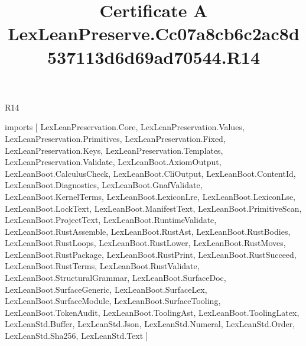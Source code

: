\begin{lexlean}{R14}
\title{Certificate A LexLeanPreserve.Cc07a8cb6c2ac8d537113d6d69ad70544.R14}
\begin{coremodule}
imports [
  LexLeanPreservation.Core,
  LexLeanPreservation.Values,
  LexLeanPreservation.Primitives,
  LexLeanPreservation.Fixed,
  LexLeanPreservation.Keys,
  LexLeanPreservation.Templates,
  LexLeanPreservation.Validate,
  LexLeanBoot.AxiomOutput,
  LexLeanBoot.CalculusCheck,
  LexLeanBoot.CliOutput,
  LexLeanBoot.ContentId,
  LexLeanBoot.Diagnostics,
  LexLeanBoot.GnafValidate,
  LexLeanBoot.KernelTerms,
  LexLeanBoot.LexiconLre,
  LexLeanBoot.LexiconLse,
  LexLeanBoot.LockText,
  LexLeanBoot.ManifestText,
  LexLeanBoot.PrimitiveScan,
  LexLeanBoot.ProjectText,
  LexLeanBoot.RuntimeValidate,
  LexLeanBoot.RustAssemble,
  LexLeanBoot.RustAst,
  LexLeanBoot.RustBodies,
  LexLeanBoot.RustLoops,
  LexLeanBoot.RustLower,
  LexLeanBoot.RustMoves,
  LexLeanBoot.RustPackage,
  LexLeanBoot.RustPrint,
  LexLeanBoot.RustSucceed,
  LexLeanBoot.RustTerms,
  LexLeanBoot.RustValidate,
  LexLeanBoot.StructuralGrammar,
  LexLeanBoot.SurfaceDoc,
  LexLeanBoot.SurfaceGeneric,
  LexLeanBoot.SurfaceLex,
  LexLeanBoot.SurfaceModule,
  LexLeanBoot.SurfaceTooling,
  LexLeanBoot.TokenAudit,
  LexLeanBoot.ToolingAst,
  LexLeanBoot.ToolingLatex,
  LexLeanStd.Buffer,
  LexLeanStd.Json,
  LexLeanStd.Numeral,
  LexLeanStd.Order,
  LexLeanStd.Sha256,
  LexLeanStd.Text
]


\end{coremodule}
\end{lexlean}
